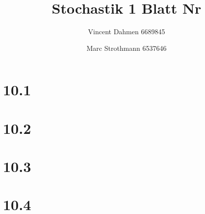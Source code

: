 \documentclass[12pt,a4paper]{article}
\title{Stochastik 1 Blatt Nr \Nr}
\author{Vincent Dahmen 6689845 \and Marc Strothmann 6537646}
\gdef\Nr{10}
\begin{document}
\maketitle{}


\section*{\Nr.1}


\section*{\Nr.2}


\section*{\Nr.3}


\section*{\Nr.4}

\end{document}
